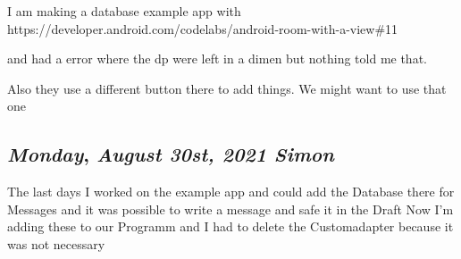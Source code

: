 I am making a database example app with 
https://developer.android.com/codelabs/android-room-with-a-view\#11

and had a error where the dp were left in a dimen but nothing told me that.

Also they use a different button there to add things. We might want to use that one

\def\day{\textit{August 30st, 2021 Simon}}
\def\weekday{\textit{Monday}}
\subsection*{\weekday, \day}

The last days I worked on the example app and could add 
the Database there for Messages and it was possible to write a 
message and safe it in the Draft
Now I'm adding these to our Programm and I had to delete the Customadapter
because it was not necessary 


